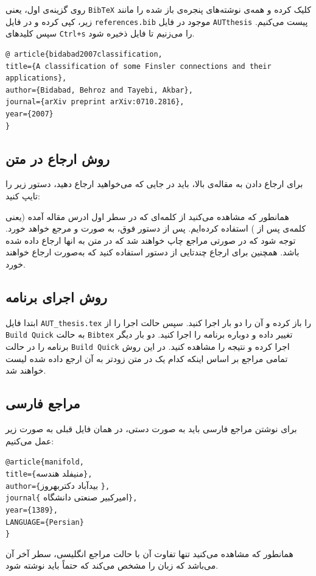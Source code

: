 روی گزینه‌ی اول، یعنی
\verb;BibTeX;
کلیک کرده و همه‌ی نوشته‌های پنجره‌ی باز شده را مانند زیر، کپی کرده و در فایل
\verb;references.bib;
موجود در فایل
\verb;AUTthesis;
پیست می‌کنیم. سپس کلیدهای
\verb;Ctrl+s;
را می‌زنیم تا فایل ذخیره شود.\\
\begin{latin}
	\normalsize
\begin{verbatim}
@ article{bidabad2007classification,
title={A classification of some Finsler connections and their applications},
author={Bidabad, Behroz and Tayebi, Akbar},
journal={arXiv preprint arXiv:0710.2816},
year={2007}
}
\end{verbatim}
\end{latin}
\subsection{روش ارجاع در متن}
برای ارجاع دادن به مقاله‌ی بالا، باید در جایی که می‌خواهید ارجاع دهید، دستور زیر را تایپ کنید:
\begin{latin}
\end{latin}
همانطور که مشاهده می‌کنید از کلمه‌ای که در سطر اول ادرس مقاله آمده (یعنی کلمه‌ی پس از
)
استفاده کرده‌ایم. پس از دستور فوق، به صورت \cite{bidabad2007classification} و \cite{aa} مرجع خواهد خورد. توجه شود که در صورتی مراجع چاپ خواهند شد که در متن به انها ارجاع داده شده باشد. همچنین برای ارجاع چندتایی از دستور 
استفاده کنید که به‌صورت \cite{najafi2008finsler, zakeri, najafi} ارجاع خواهند خورد.
\subsection{روش اجرای برنامه}
ابتدا فایل
\verb;AUT_thesis.tex;
را باز کرده و آن را دو بار اجرا کنید. سپس حالت اجرا را از 
\verb;Build Quick;
به حالت
\verb;Bibtex;
تغییر داده و دوباره برنامه را اجرا کنید. دو بار دیگر برنامه را در حالت 
\verb;Build Quick;
اجرا کرده و نتیجه را مشاهده کنید. در این روش تمامی مراجع بر اساس اینکه کدام یک در متن زودتر به آن ارجع داده شده لیست خواهند شد.
\subsection{مراجع فارسی}
برای نوشتن مراجع فارسی باید به صورت دستی، در همان فایل قبلی به صورت زیر عمل می‌کنیم:
\begin{LTR}
\noindent\verb;@article{manifold,;\\
\verb;title={;منیفلد هندسه\verb;},;\\
\verb;author={;بیدآباد دکتربهروز \verb;},;\\
\verb;journal{; امیرکبیر صنعتی دانشگاه\verb;},;\\
\verb;year={1389},;\\
\verb;LANGUAGE={Persian};\\
\verb;};
\end{LTR}
همانطور که مشاهده می‌کنید تنها تفاوت آن با حالت مراجع انگلیسی، سطر آخر آن می‌باشد که زبان را مشخص می‌کند که حتماً باید نوشته شود.
